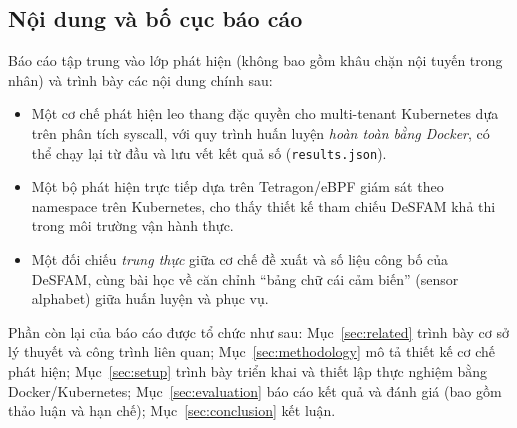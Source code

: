 \subsection{Nội dung và bố cục báo cáo}
Báo cáo tập trung vào lớp phát hiện (không bao gồm khâu chặn nội tuyến trong nhân)
và trình bày các nội dung chính sau:
\begin{itemize}[leftmargin=1.6em]
  \item Một cơ chế phát hiện leo thang đặc quyền cho multi-tenant Kubernetes dựa
        trên phân tích syscall, với quy trình huấn luyện \emph{hoàn toàn bằng
        Docker}, có thể chạy lại từ đầu và lưu vết kết quả số (\texttt{results.json}).
  \item Một bộ phát hiện trực tiếp dựa trên Tetragon/eBPF giám sát theo namespace
        trên Kubernetes, cho thấy thiết kế tham chiếu DeSFAM khả thi trong môi
        trường vận hành thực.
  \item Một đối chiếu \emph{trung thực} giữa cơ chế đề xuất và số liệu công bố của
        DeSFAM, cùng bài học về căn chỉnh ``bảng chữ cái cảm biến'' (sensor alphabet)
        giữa huấn luyện và phục vụ.
\end{itemize}

Phần còn lại của báo cáo được tổ chức như sau: Mục~\ref{sec:related} trình bày cơ
sở lý thuyết và công trình liên quan; Mục~\ref{sec:methodology} mô tả thiết kế cơ
chế phát hiện; Mục~\ref{sec:setup} trình bày triển khai và thiết lập thực nghiệm
bằng Docker/Kubernetes; Mục~\ref{sec:evaluation} báo cáo kết quả và đánh giá (bao
gồm thảo luận và hạn chế); Mục~\ref{sec:conclusion} kết luận.
